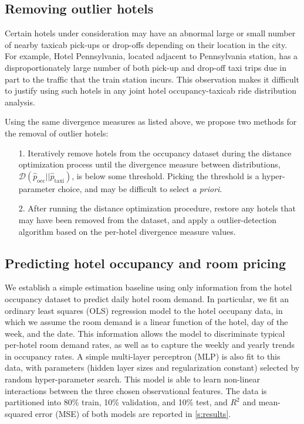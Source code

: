 \documentclass[useAMS, referee, usenatbib]{biom}
\begin{document}
\subsection{Removing outlier hotels}

Certain hotels under consideration may have an abnormal large or small number of nearby taxicab pick-ups or drop-offs depending on their location in the city. For example, Hotel Pennsylvania, located adjacent to Pennsylvania station, has a disproportionately large number of both pick-up and drop-off taxi trips due in part to the traffic that the train station incurs. This observation makes it difficult to justify using such hotels in any joint hotel occupancy-taxicab ride distribution analysis.

Using the same divergence measures as listed above, we propose two methods for the removal of outlier hotels:

\begin{itemize}

\item [1.] Iteratively remove hotels from the occupancy dataset during the distance optimization process until the divergence measure between distributions, $\mathcal{D} (\hat{p}_{\mathrm{occ}} || \hat{p}_{\mathrm{taxi}})$, is below some threshold. Picking the threshold is a hyper-parameter choice, and may be difficult to select \textit{a priori}.

\item [2.] After running the distance optimization procedure, restore any hotels that may have been removed from the dataset, and apply a outlier-detection algorithm based on the per-hotel divergence measure values.

\end{itemize}

\subsection{Predicting hotel occupancy and room pricing}

We establish a simple estimation baseline using only information from the hotel occupancy dataset to predict daily hotel room demand. In particular, we fit an ordinary least squares (OLS) regression model to the hotel occupany data, in which we assume the room demand is a linear function of the hotel, day of the week, and the date. This information allows the model to discriminate typical per-hotel room demand rates, as well as to capture the weekly and yearly trends in occupancy rates. A simple multi-layer perceptron (MLP) is also fit to this data, with parameters (hidden layer sizes and regularization constant) selected by random hyper-parameter search. This model is able to learn non-linear interactions between the three chosen observational features. The data is partitioned into 80\% train, 10\% validation, and 10\% test, and $R^2$ and mean-squared error (MSE) of both models are reported in \ref{s:results}.
\end{document}
